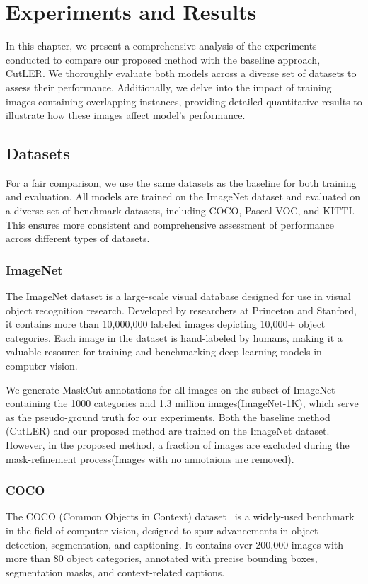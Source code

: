 \chapter{Experiments and Results}\label{chap:experiments}
In this chapter, we present a comprehensive analysis of the experiments conducted to compare our proposed method with the baseline approach, CutLER. We thoroughly evaluate both models across a diverse set of datasets to assess their performance. Additionally, we delve into the impact of training images containing overlapping instances, providing detailed quantitative results to illustrate how these images affect model's performance. 

\section{Datasets}
For a fair comparison, we use the same datasets as the baseline for both training and evaluation. All models are trained on the ImageNet dataset and evaluated on a diverse set of benchmark datasets, including COCO, Pascal VOC, and KITTI. This ensures more consistent and comprehensive assessment of performance across different types of datasets.

\subsection{ImageNet}
The ImageNet dataset is a large-scale visual database designed for use in visual object recognition research. Developed by researchers at Princeton and Stanford, it contains more than 10,000,000 labeled images depicting 10,000+ object categories. Each image in the dataset is hand-labeled by humans, making it a valuable resource for training and benchmarking deep learning models in computer vision.

We generate MaskCut annotations for all images on the subset of ImageNet containing the 1000 categories and 1.3 million images(ImageNet-1K), which serve as the pseudo-ground truth for our experiments. Both the baseline method (CutLER) and our proposed method are trained on the ImageNet dataset. However, in the proposed method, a fraction of images are excluded during the mask-refinement process(Images with no annotaions are removed).

\subsection{COCO}
The COCO (Common Objects in Context) dataset~\cite{lin2015microsoftcococommonobjects} is a widely-used benchmark in the field of computer vision, designed to spur advancements in object detection, segmentation, and captioning. It contains over 200,000 images with more than 80 object categories, annotated with precise bounding boxes, segmentation masks, and context-related captions. 

